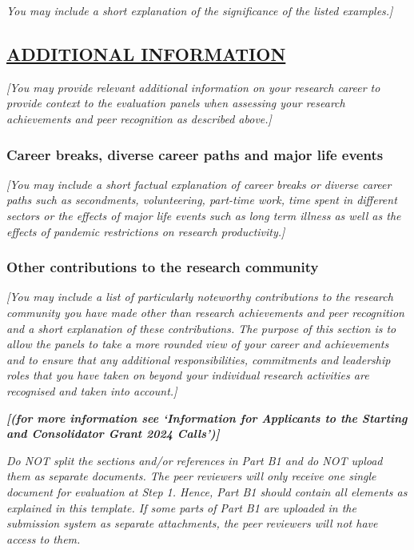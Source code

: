\documentclass[b1]{erc} %
\begin{document}
\textit{You may include a short explanation of the significance of the listed examples.]}

\subsection*{\underline{ADDITIONAL INFORMATION}}

\textit{[You may provide relevant additional information on your research career to provide context to the evaluation panels when assessing your research achievements and peer recognition as described above.]}

\subsubsection*{Career breaks, diverse career paths and major life events}

\textit{[You may include a short factual explanation of career breaks or diverse career paths such as secondments, volunteering, part-time work, time spent in different sectors or the effects of major life events such as long term illness as well as the effects of pandemic restrictions on research productivity.]}

\subsubsection*{Other contributions to the research community}

\textit{[You may include a list of particularly noteworthy contributions to the research community you have made other than research achievements and peer recognition and a short explanation of these contributions. The purpose of this section is to allow the panels to take a more rounded view of your career and achievements and to ensure that any additional responsibilities, commitments and leadership roles that you have taken on beyond your individual research activities are recognised and taken into account.]}

\textit{\textbf{[(for more information see ‘Information for Applicants to the Starting and Consolidator Grant 2024 Calls’)]}}

\textit{\color{red} Do NOT split the sections and/or references in Part B1 and do NOT upload them as separate documents. The peer reviewers will only receive one single document for evaluation at Step 1. Hence, Part B1 should contain all elements as explained in this template. If some parts of Part B1 are uploaded in the submission system as separate attachments, the peer reviewers will not have access to them.}
\end{document}

